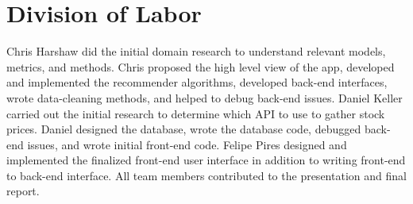 \documentclass{article}
\begin{document}
\section{Division of Labor}
Chris Harshaw did the initial domain research to understand relevant models, metrics, and methods. Chris proposed the high level view of the app, developed and implemented the recommender algorithms, developed back-end interfaces, wrote data-cleaning methods, and helped to debug back-end issues.  Daniel Keller carried out the initial research to determine which API to use to gather stock prices. Daniel designed the database, wrote the database code, debugged back-end issues, and wrote initial front-end code. Felipe Pires designed and implemented the finalized front-end user interface in addition to writing front-end to back-end interface. All team members contributed to the presentation and final report.
\end{document}
